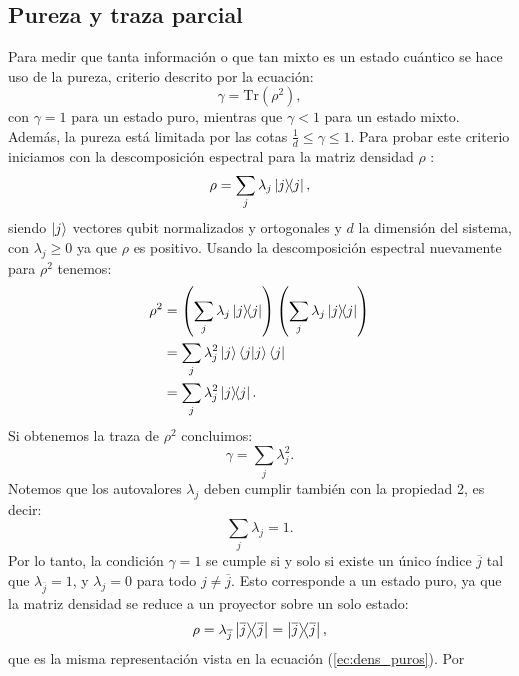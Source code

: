 \documentclass[letterpaper,12pt]{thesisECFM}
\theoremstyle{plain}
\theoremstyle{definition}
\theoremstyle{definition}
\theoremstyle{remark}
\newcommand{\1}{\mathbb{1}}
\begin{document}
\subsection{Pureza y traza parcial} %
Para medir que tanta información o que tan mixto es un estado cuántico se hace uso de la pureza, criterio descrito por la ecuación:
\begin{equation}
    \label{ec::1.25}
    \gamma = \text{Tr}(\rho ^2),
\end{equation}
con $\gamma=1$ para un estado puro, mientras que $\gamma < 1$ para un estado
mixto. Además, la pureza está limitada por las cotas $ \frac{1}{d}\leq\gamma\leq 1$.  Para probar este criterio iniciamos con la descomposición espectral
\cite{princip_quantum} para la matriz densidad $\rho$ :
    \begin{equation} 
        \label{ec:dens_espectral}
        \rho = \sum_{j} \lambda_j \ketbra{j},
    \end{equation}
siendo $\ket{j}$ vectores  qubit normalizados y ortogonales y $d$ la dimensión del sistema, con  $\lambda_j \geq0$ ya que $\rho$ es positivo. 
 Usando la descomposición espectral nuevamente para $\rho^2$ tenemos:
    \begin{align}
        \rho^2 & = \left( \sum_{j} \lambda_j \ketbra{j} \right) \left( \sum_{j} \lambda_j \ketbra{j} \right) \\
        &= \sum_{j} \lambda^2_j \ket{j}\braket{j}\bra{j} \\
        & = \sum_{j} \lambda_j^2\ketbra{j}.
    \end{align}
Si obtenemos la traza de $\rho^2$ concluimos: 
    \begin{equation}
    \label{eq:pureza_lambdas}
    \gamma=\sum_j\lambda_j^2.
    \end{equation} 
Notemos que los autovalores $\lambda_j$ deben cumplir también con la propiedad 2, es decir:
    \begin{equation}
    \label{ec:dens_eigvals}
    \sum_j \lambda_j = 1.
    \end{equation} 
Por lo tanto, la condición $\gamma = 1$ se cumple si y solo si existe un único
índice $\overline{j}$ tal que $\lambda_{\overline{j}} = 1$, y $\lambda_j = 0$
para todo $j \ne \overline{j}$.  Esto corresponde a un estado puro, ya que la matriz densidad se
reduce a un proyector sobre un solo estado:
\begin{equation}
\rho  = \lambda_{\overline{j}} \ketbra{\overline{j}} = \ketbra{\overline{j}},
\end{equation}
que es la misma representación vista en la ecuación (\ref{ec:dens_puros}). Por
\end{document}
